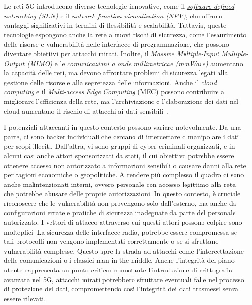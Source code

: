 \documentclass[english]{article}
\begin{document}
Le reti 5G introducono diverse tecnologie innovative, come il
\textit{\hyperlink{SDN}{software-defined networking (SDN)}} e il
\textit{\hyperlink{NFV}{network function virtualization (NFV)}}, che offrono
vantaggi significativi in termini di flessibilità e scalabilità. Tuttavia,
queste tecnologie espongono anche la rete a nuovi rischi di sicurezza, come
l'esaurimento delle risorse e vulnerabilità nelle interfacce di programmazione,
che possono diventare obiettivi per attacchi mirati. Inoltre, il
\textit{\hyperlink{MIMO}{Massive Multiple-Input Multiple-Output (MIMO)}} e le
\textit{\hyperlink{mmWave}{comunicazioni a onde millimetriche (mmWave)}}
aumentano la capacità delle reti, ma devono affrontare problemi di sicurezza
legati alla gestione delle risorse e alla segretezza delle informazioni. Anche
il \textit{cloud computing} e il \textit{Multi-access Edge Computing} (MEC)
possono contribuire a migliorare l'efficienza della rete, ma l'archiviazione e
l'elaborazione dei dati nel cloud aumentano il rischio di attacchi ai dati
sensibili~\cite{Ahmad2019Security}.

I potenziali attaccanti in questo contesto possono variare notevolmente. Da una
parte, ci sono hacker individuali che cercano di intercettare o manipolare i
dati per scopi illeciti. Dall'altra, vi sono gruppi di cyber-criminali
organizzati, e in alcuni casi anche attori sponsorizzati da stati, il cui
obiettivo potrebbe essere ottenere accesso non autorizzato a informazioni
sensibili o causare danni alla rete per ragioni economiche o geopolitiche. A
rendere più complesso il quadro ci sono anche malintenzionati interni, ovvero
personale con accesso legittimo alla rete, che potrebbe abusare delle proprie
autorizzazioni. In questo contesto, è cruciale riconoscere che le vulnerabilità
non provengono solo dall'esterno, ma anche da configurazioni errate e pratiche
di sicurezza inadeguate da parte del personale autorizzato. I vettori di
attacco attraverso cui questi attori possono colpire sono molteplici. La
sicurezza delle interfacce radio, potrebbe essere compromessa se tali
protocolli non vengono implementati correttamente o se si sfruttano
vulnerabilità complesse. Questo apre la strada ad attacchi come
l'intercettazione delle comunicazioni o i classici man-in-the-middle. Anche
l'integrità del piano utente rappresenta un punto critico: nonostante
l'introduzione di crittografia avanzata nel 5G, attacchi mirati potrebbero
sfruttare eventuali falle nel processo di protezione dei dati, compromettendo
così l'integrità dei dati trasmessi senza essere rilevati.
\end{document}
